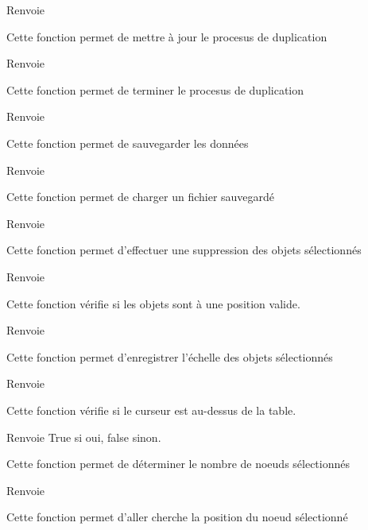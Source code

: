 \begin{DoxyReturn}{Renvoie}

\end{DoxyReturn}
Cette fonction permet de mettre à jour le procesus de duplication

\begin{DoxyReturn}{Renvoie}

\end{DoxyReturn}
Cette fonction permet de terminer le procesus de duplication

\begin{DoxyReturn}{Renvoie}

\end{DoxyReturn}
Cette fonction permet de sauvegarder les données

\begin{DoxyReturn}{Renvoie}

\end{DoxyReturn}
Cette fonction permet de charger un fichier sauvegardé

\begin{DoxyReturn}{Renvoie}

\end{DoxyReturn}
Cette fonction permet d'effectuer une suppression des objets sélectionnés

\begin{DoxyReturn}{Renvoie}

\end{DoxyReturn}
Cette fonction vérifie si les objets sont à une position valide.

\begin{DoxyReturn}{Renvoie}

\end{DoxyReturn}
Cette fonction permet d'enregistrer l'échelle des objets sélectionnés

\begin{DoxyReturn}{Renvoie}

\end{DoxyReturn}
Cette fonction vérifie si le curseur est au-\/dessus de la table.

\begin{DoxyReturn}{Renvoie}
True si oui, false sinon.
\end{DoxyReturn}
Cette fonction permet de déterminer le nombre de noeuds sélectionnés

\begin{DoxyReturn}{Renvoie}

\end{DoxyReturn}
Cette fonction permet d'aller cherche la position du noeud sélectionné

